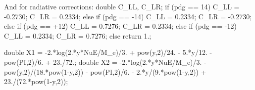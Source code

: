 And for radiative corrections:
    double C_LL, C_LR;                                                                                                                                             
    if (pdg == 14) {                                                                                                                                               
      C_LL = -0.2730;                                                                                                                                              
      C_LR =  0.2334;                                                                                                                                              
    } else if (pdg == -14) {                                                                                                                                       
      C_LL =  0.2334;                                                                                                                                              
      C_LR = -0.2730;                                                                                                                                              
    } else if (pdg == +12) {                                                                                                                                       
      C_LL = 0.7276;                                                                                                                                               
      C_LR = 0.2334;                                                                                                                                               
    } else if (pdg == -12) {                                                                                                                                       
      C_LL = 0.2334;                                                                                                                                               
      C_LR = 0.7276;                                                                                                                                               
    } else return 1.;
    
    double X1 = -2.*log(2.*y*NuE/M_e)/3. + pow(y,2)/24. - 5.*y/12. -                                                                                               
                pow(PI,2)/6. + 23./72.;                                                                                                                            
    double X2 = -2.*log(2.*y*NuE/M_e)/3. - pow(y,2)/(18.*pow(1-y,2)) -                                                                                             
                pow(PI,2)/6. - 2.*y/(9.*pow(1-y,2)) + 23./(72.*pow(1-y,2));                                                                                        
                                                                                                                                                                   
